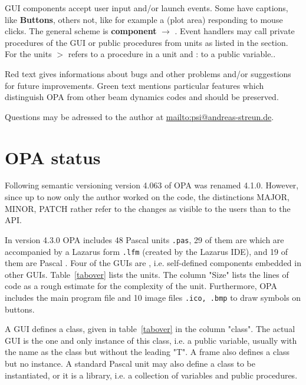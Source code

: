 \documentclass[12pt]{article}
\newcommand\code[1]{{\tt #1}}
\newcommand{\ofld}[1]{\colorbox{black!15}{{{\color{black}\bf #1}}}}
\newcommand{\ofldx}[1]{\colorbox{black!15}{{\color{black}(#1)}}}
\newcommand\guico[1]{{\color{blue}\code{#1}}}
\newcommand{\unico}[1]{{\color{burntorange}\code{#1}}}
\newcommand{\evcod}[2]{\ofld{#1} $\rightarrow$ \guico{#2}}
\newcommand{\prcod}[2]{\opauni{#1}$>$\unico{#2}}
\newcommand{\vrcod}[2]{\opauni{#1}:\unico{#2}}
\newcommand{\opagui}[1]{\colorbox{blue!20}{{\color{black}\code{#1}}}}
\newcommand{\opaguif}[1]{\colorbox{violet!30}{{\color{black}\code{#1}}}}
\newcommand{\opauni}[1]{\colorbox{orange!30}{{\color{black}\code{#1}}}}
\newcommand{\ouni}[1]{\hyperref[#1]{\opauni{#1}}}
\newcommand{\todo}[1]{{\color{red} #1}}
\newcommand{\feature}[1]{{\color{cadmiumgreen} #1}}
\begin{document}
GUI components accept user input and/or launch events. Some have captions, like \ofld{Buttons}, others not, like for example a \ofldx{plot area} responding to mouse clicks. The general scheme is \evcod{component}{event handler}. Event handlers may call private procedures of the GUI or public procedures from units as listed in the \guico{uses} section. For the units \prcod{unit}{procedure} refers to a procedure in a unit and \vrcod{unit}{variable} to a public variable..

\todo{Red text gives informations about bugs and other problems and/or suggestions for future improvements.} \feature{Green text mentions particular features which distinguish OPA from other beam dynamics codes and should be preserved.}

Questions may be adressed to the author at \url{mailto:psi@andreas-streun.de}.

\newpage


\section{OPA status}

Following semantic versioning \cite{semver} version 4.063 of OPA was renamed 4.1.0. However, since up to now only the author worked on the code, the distinctions MAJOR, MINOR, PATCH rather refer to the changes as visible to the users than to the API. 

In version 4.3.0 OPA includes 48 Pascal units \code{.pas}, 29 of them are \opagui{GUIs} which are accompanied by a Lazarus form \code{.lfm} (created by the Lazarus IDE), and 19 of them are Pascal \opauni{units}. Four of the GUIs are \opaguif{frames}, i.e. self-defined components embedded in other GUIs.
Table~\ref{tabover} lists the units. The column "Size" lists the lines of code as a rough estimate for the complexity of the unit. Furthermore, OPA includes the main program file \ouni{{opa.lpr}} and 10 image files \code{.ico, .bmp} to draw symbols on buttons. 

A GUI defines a class, given in table~\ref{tabover} in the column "class". The actual GUI is the one and only instance of this class, i.e. a public variable, usually with the name as the class but without the leading "T". A frame also defines a class but no instance.
A standard Pascal unit may also define a class to be instantiated, or it is a library, i.e. a collection of variables and public procedures.
\end{document}
